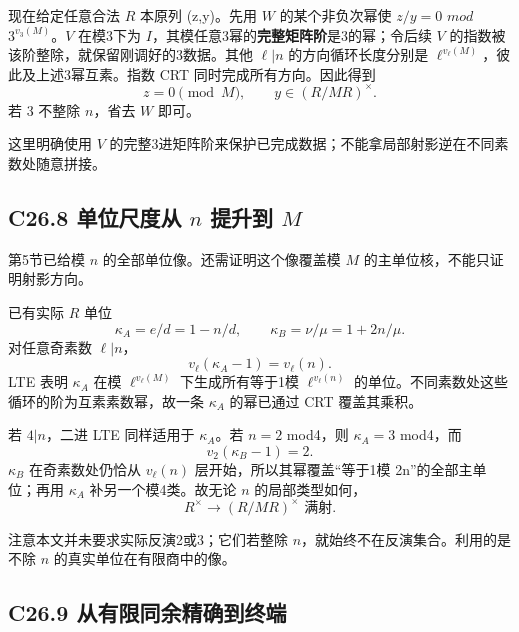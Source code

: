 {现在给定任意合法} {\ensuremath{R}} {本原列} {(z,y)。先用} {\ensuremath{W}} {的某个非负次幂使} {\ensuremath{z/y=0}} {\ensuremath{mod}} {\ensuremath{3^{v_{3}(M)}}。\ensuremath{V}} {在模3下为} {\ensuremath{I}，其模任意3幂的}\textbf{{完整矩阵阶}}{是3的幂；令后续} {\ensuremath{V}} {的指数被该阶整除，就保留刚调好的3数据。其他} {\ensuremath{\ell |n}} {的方向循环长度分别是} {\ensuremath{\ell ^{v_\ell (M)}}，彼此及上述3幂互素。指数} {CRT} {同时完成所有方向。因此得到} \[
z=0\pmod M,\qquad y\in(R/MR)^\times.
\tag{C26.7.4}
\] {若} {3} {不整除} {\ensuremath{n}，省去} {\ensuremath{W}} {即可。}

{这里明确使用} {\ensuremath{V}} {的完整3进矩阵阶来保护已完成数据；不能拿局部射影逆在不同素数处随意拼接。}

\subsection*{\texorpdfstring{{C26.8} {单位尺度从} {\ensuremath{n}} {提升到} {\ensuremath{M}}}{C26.8 单位尺度从  提升到 }}\label{C26-h166}

{第5节已给模} {\ensuremath{n}} {的全部单位像。还需证明这个像覆盖模} {\ensuremath{M}} {的主单位核，不能只证明射影方向。}

{已有实际} {\ensuremath{R}} {单位} \[
\kappa_A=e/d=1-n/d,\qquad
\kappa_B=\nu/\mu=1+2n/\mu.
\tag{C26.8.1}
\] {对任意奇素数} {\ensuremath{\ell |n}，} \[
v_\ell(\kappa_A-1)=v_\ell(n).
\] {LTE} {表明} {\ensuremath{\kappa _{A}}} {在模} {\ensuremath{\ell ^{v_\ell (M)}}} {下生成所有等于1模} {\ensuremath{\ell ^{v_\ell (n)}}} {的单位。不同素数处这些循环的阶为互素素数幂，故一条} {\ensuremath{\kappa _{A}}} {的幂已通过} {CRT} {覆盖其乘积。}

{若} {\ensuremath{4|n}，二进} {LTE} {同样适用于} {\ensuremath{\kappa _{A}}。若} {\ensuremath{n=2}} {mod4，则} {\ensuremath{\kappa _{A}=3}} {mod4，而} \[
v_2(\kappa_B-1)=2.
\] {\ensuremath{\kappa _{B}}} {在奇素数处仍恰从} {\ensuremath{v_\ell (n)}} {层开始，所以其幂覆盖``等于1模} {2n''的全部主单位；再用} {\ensuremath{\kappa _{A}}} {补另一个模4类。故无论} {\ensuremath{n}} {的局部类型如何，} \[
\boxed{R^\times\longrightarrow(R/MR)^\times
\text{ 满射}.}
\tag{C26.8.2}
\]

{注意本文并未要求实际反演2或3；它们若整除} {\ensuremath{n}，就始终不在反演集合。利用的是不除} {\ensuremath{n}} {的真实单位在有限商中的像。}

\subsection*{\texorpdfstring{{C26.9} {从有限同余精确到终端}}{C26.9 从有限同余精确到终端}}\label{C26-h167}

